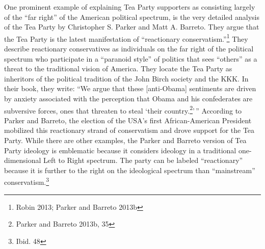 \documentclass[12pt,]{article}
\begin{document}
One prominent example of explaining Tea Party supporters as consisting
largely of the ``far right'' of the American political spectrum, is the
very detailed analysis of the Tea Party by Christopher S. Parker and
Matt A. Barreto. They argue that the Tea Party is the latest
manifestation of ``reactionary conservatism.''\footnote{Robin 2013;
  Parker and Barreto 2013b} They describe reactionary conservatives as
individuals on the far right of the political spectrum who participate
in a ``paranoid style'' of politics that sees ``others'' as a threat to
the traditional vision of America. They locate the Tea Party as
inheritors of the political tradition of the John Birch society and the
KKK. In their book, they write: ``We argue that these {[}anti-Obama{]}
sentiments are driven by anxiety associated with the perception that
Obama and his confederates are subversive forces, ones that threaten to
steal `their country.\footnote{Parker and Barreto 2013b, 35}'\,''
According to Parker and Barreto, the election of the USA's first
African-American President mobilized this reactionary strand of
conservatism and drove support for the Tea Party. While there are other
examples, the Parker and Barreto version of Tea Party ideology is
emblematic because it considers ideology in a traditional
one-dimensional Left to Right spectrum. The party can be labeled
``reactionary'' because it is further to the right on the ideological
spectrum than ``mainstream'' conservatism.\footnote{Ibid. 48}
\end{document}
